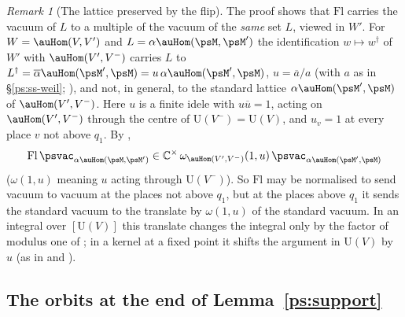 \documentclass[10pt]{amsart}
\theoremstyle{definition}
\theoremstyle{remark}
\newtheorem{remark}[theorem]{Remark}
\newcommand{\C}{\mathbb C}
\providecommand{\auU}{\mathrm U}
\providecommand{\aubar}[1]{\overline{#1}}
\begin{document}
\begin{remark}[The lattice preserved by the flip]\label{pf:rem-flip-lattice}
The proof shows that $\mathrm{Fl}$ carries the vacuum of $L$ to a multiple of the vacuum of the
\emph{same} set $L$, viewed in $W'$. For $W=\auHom(V,V')$ and $L=\alpha\auHom(\psM,\psM')$ the
identification $w\mapsto w^\dagger$ of $W'$ with $\auHom(V',V^-)$ carries $L$ to
$L^\dagger=\aubar\alpha\auHom(\psM',\psM)=u\,\alpha\auHom(\psM',\psM)$, $u=\aubar a/a$ (with $a$ as in
\S\ref{ps:ss-weil}; {\cite[Lemma~6.32(f)]{P53}}), and not, in general, to the standard lattice
$\alpha\auHom(\psM',\psM)$ of $\auHom(V',V^-)$. Here $u$ is a finite idele with $u\aubar u=1$, acting on
$\auHom(V',V^-)$ through the centre of $\auU(V^-)=\auU(V)$, and $u_v=1$ at every place $v$ not above
$q_1$. By {\cite[Lemma~6.32(e)]{P53}},
\[
\mathrm{Fl}\,\psvac_{\alpha\auHom(\psM,\psM')}\in\C^\times\,\omega_{\auHom(V',V^-)}(1,u)\,
\psvac_{\alpha\auHom(\psM',\psM)}
\]
($\omega(1,u)$ meaning $u$ acting through $\auU(V^-)$). So $\mathrm{Fl}$ may be normalised to send
vacuum to vacuum at the places not above $q_1$, but at the places above $q_1$ it sends the standard
vacuum to the translate by $\omega(1,u)$ of the standard vacuum. In an integral over $[\auU(V)]$
this translate changes the integral only by the factor of modulus one of {\cite[Lemma~6.32(e)]{P53}}; in a
kernel at a fixed point it shifts the argument in $\auU(V)$ by $u$ (as in {\cite[Proposition~4.40]{P53}} and
{\cite[Lemma~5.37]{P53}}).
\end{remark}

\subsection{The orbits at the end of Lemma~\ref{ps:support}}\label{pf:ss-orbits}
\end{document}
